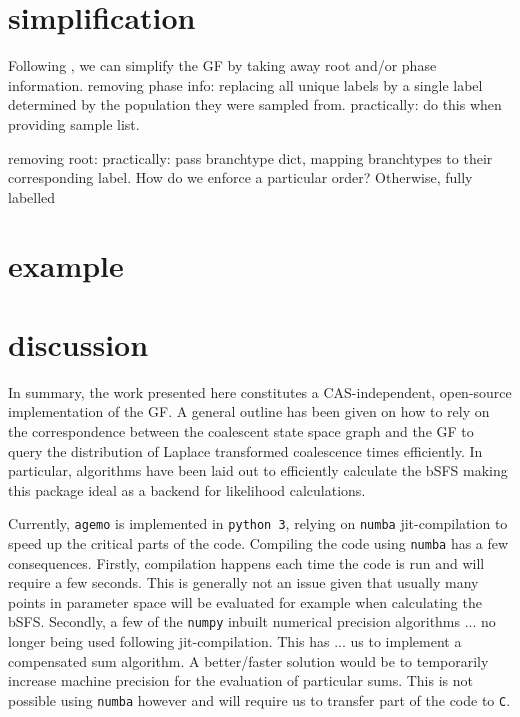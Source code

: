 \documentclass[10pt, a4]{article}
\begin{document}
\section{simplification}

Following \citet{Lohse2016}, we can simplify the GF by taking away root and/or phase information.
removing phase info: replacing all unique labels by a single label determined by the population they were sampled from.
practically: do this when providing sample list.

removing root: 
practically: pass branchtype dict, mapping branchtypes to their corresponding label. How do we enforce a particular order?
Otherwise, fully labelled 

\section{example}


\section{discussion}
%
In summary, the work presented here constitutes a CAS-independent, open-source implementation of the GF. A general outline has been given on how to rely on the correspondence between the coalescent state space graph and the GF to query the distribution of Laplace transformed coalescence times efficiently. In particular, algorithms have been laid out to efficiently calculate the bSFS making this package ideal as a backend for likelihood calculations.

Currently, \texttt{agemo} is implemented in \texttt{python 3}, relying on \texttt{numba} jit-compilation to speed up the critical parts of the code. Compiling the code using \texttt{numba} has a few consequences. Firstly, compilation happens each time the code is run and will require a few seconds. This is generally not an issue given that usually many points in parameter space will be evaluated for example when calculating the bSFS. Secondly, a few of the \texttt{numpy} inbuilt numerical precision algorithms ... no longer being used following jit-compilation. This has ... us to implement a compensated sum algorithm.  A better/faster solution would be to temporarily increase machine precision for the evaluation of particular sums. This is not possible using \texttt{numba} however and will require us to transfer part of the code to \texttt{C}.
\end{document}
